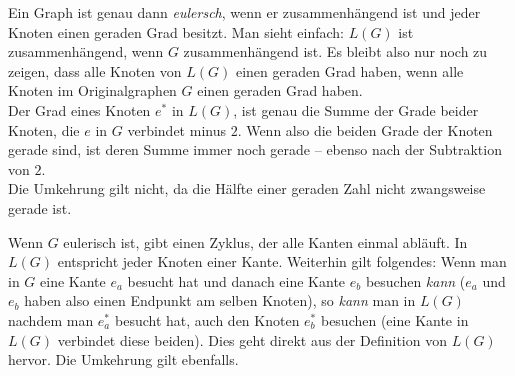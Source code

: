 \documentclass[11pt]{scrartcl} %
\begin{document}
\begin{compactenum}[(a)]
\item Ein Graph ist genau dann \emph{eulersch}, wenn er zusammenhängend ist und jeder Knoten einen geraden Grad besitzt. Man sieht einfach: $L(G)$ ist zusammenhängend, wenn $G$ zusammenhängend ist. Es bleibt also nur noch zu zeigen, dass alle Knoten von $L(G)$ einen geraden Grad haben, wenn alle Knoten im Originalgraphen $G$ einen geraden Grad haben.\\
Der Grad eines Knoten $e^*$ in $L(G)$, ist genau die Summe der Grade beider Knoten, die $e$ in $G$ verbindet minus $2$. Wenn also die beiden Grade der Knoten gerade sind, ist deren Summe immer noch gerade -- ebenso nach der Subtraktion von $2$.\\
Die Umkehrung gilt nicht, da die Hälfte einer geraden Zahl nicht zwangsweise gerade ist.\\

\item Wenn $G$ eulerisch ist, gibt einen Zyklus, der alle Kanten einmal abläuft. In $L(G)$ entspricht jeder Knoten einer Kante. Weiterhin gilt folgendes: Wenn man in $G$ eine Kante $e_a$ besucht hat und danach eine Kante $e_b$ besuchen \emph{kann} ($e_a$ und $e_b$ haben also einen Endpunkt am selben Knoten), so \emph{kann} man in $L(G)$ nachdem man $e_a^*$ besucht hat, auch den Knoten $e_b^*$ besuchen (eine Kante in $L(G)$ verbindet diese beiden). Dies geht direkt aus der Definition von $L(G)$ hervor. Die Umkehrung gilt ebenfalls.

\end{compactenum}
\end{document}
